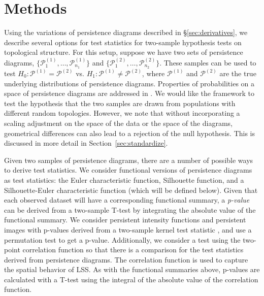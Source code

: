 \documentclass[12pt]{article}
\begin{document}

\section{Methods} \label{sec:methods}
\begin{sloppypar}
Using the variations of persistence diagrams described in \S \ref{sec:derivatives}, 
we describe several options for test statistics for two-sample hypothesis tests on topological structure.  
For this setup, suppose we have two sets of persistence diagrams, $\{\mathcal P_1^{(1)}, \ldots, \mathcal P_{n_1}^{(1)}\}$ and $\{\mathcal P_1^{(2)}, \ldots, \mathcal P_{n_2}^{(2)}\}$.  These samples can be used to test $H_0: \mathcal
P^{(1)} = \mathcal P^{(2)}$ vs. $H_1: \mathcal P^{(1)} \neq \mathcal P^{(2)}$, where $\mathcal P^{(1)}$ and $\mathcal P^{(2)}$ are the true underlying distributions of persistence diagrams.  Properties of probabilities on a space of persistence diagrams are addressed in \citep{Mileyko:2011aa}. We would like the framework to test the hypothesis that the two samples are drawn from populations with different random topologies. However, we note that without incorporating a scaling adjustment on the space of the data or the space of the diagrams, geometrical differences can also lead to a rejection of the null hypothesis. This is discussed in more detail in Section~\ref{sec:standardize}.
\end{sloppypar}

Given two samples of persistence diagrams, there are a number of possible ways to derive test statistics. We consider functional versions of persistence diagrams as test statistics:  the Euler characteristic function, Silhouette function, and a Silhouette-Euler characteristic function (which will be defined below). 
Given that each observed dataset will have a corresponding functional summary, a \emph{p-value} can be derived from a two-sample T-test by integrating the absolute value of the functional summary. 
We consider persistent intensity functions and persistent images with p-values derived from a two-sample kernel test statistic \citep{gretton2012kernel}, and use a permutation test to get a p-value. 
%
Additionally, we consider a test using the two-point correlation function so that there is a comparison for the test statistics derived from persistence diagrams.  The correlation function is used to capture the spatial behavior of LSS.
As with the functional summaries above, p-values are calculated with a T-test using the integral of the absolute value of the correlation function. 
\end{document}
